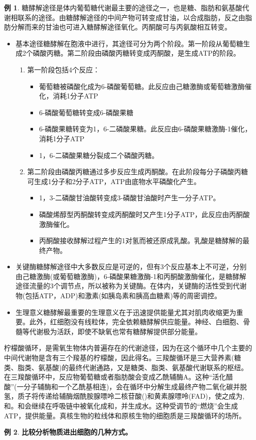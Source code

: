 \documentclass[UTF8]{article}
\theoremstyle{definition}
\newtheorem{example}{例}[section]
\begin{document}
\begin{example}
    糖酵解途径是体内葡萄糖代谢最主要的途径之一，也是糖、脂肪和氨基酸代谢相联系的途径。由糖酵解途径的中间产物可转变成甘油，以合成脂肪，反之由脂肪分解而来的甘油也可进入糖酵解途径氧化。丙酮酸可与丙氨酸相互转变。\begin{itemize}
        \item 基本途径糖酵解在胞液中进行，其途径可分为两个阶段。第一阶段从葡萄糖生成2个磷酸丙糖。第二阶段由磷酸丙糖转变成丙酮酸，是生成ATP的阶段。\begin{enumerate}
            \item 第一阶段包括4个反应：\begin{itemize}
                \item 葡萄糖被磷酸化成为6-磷酸葡萄糖。此反应由己糖激酶或葡萄糖激酶催化，消耗1分子ATP\item 6-磷酸葡萄糖转变成6-磷酸果糖\item 6-磷酸果糖转变为1，6-二磷酸果糖。此反应由6-磷酸果糖激酶-1催化，消耗1分子ATP\item 1，6-二磷酸果糖分裂成二个磷酸丙糖。
            \end{itemize}
            \item 第二阶段由磷酸丙糖通过多步反应生成丙酮酸。在此阶段每分子磷酸丙糖可生成1分子和2分子ATP，ATP由底物水平磷酸化产生。\begin{itemize}
                \item 1，3-二磷酸甘油酸转变成3-磷酸甘油酸时产生一分子ATP。\item 磷酸烯醇型丙酮酸转变成丙酮酸时又产生1分子ATP，此反应由丙酮酸激酶催化。\item 丙酮酸接收酵解过程产生的1对氢而被还原成乳酸。乳酸是糖酵解的最终产物。
            \end{itemize}
        \end{enumerate}
        \item 关键酶糖酵解途径中大多数反应是可逆的，但有3个反应基本上不可逆，分别由己糖激酶(或葡萄糖激酶)，6-磷酸果糖激酶-1和丙酮酸激酶催化，是糖酵解途径流量的3个调节点，所以被称为关键酶。在体内，关键酶的活性受到代谢物(包括ATP，ADP)和激素(如胰岛素和胰高血糖素)等的周密调控。
        \item 生理意义糖酵解最重要的生理意义在于迅速提供能量尤其对肌肉收缩更为重要。此外，红细胞没有线粒体，完全依赖糖酵解供应能量。神经、白细胞、骨髓等代谢极为活跃，即使不缺氧也常有糖酵解提供部分能量。
    \end{itemize}
    柠檬酸循环，是需氧生物体内普遍存在的代谢途径，因为在这个循环中几个主要的中间代谢物是含有三个羧基的柠檬酸，因此得名。三羧酸循环是三大营养素(糖类、脂类、氨基酸)的最终代谢通路，又是糖类、脂类、氨基酸代谢联系的枢纽。
    在三羧酸循环中，反应物葡萄糖或者脂肪酸会变成乙酰辅酶A。这种“活化醋酸”(一分子辅酶和一个乙酰基相连)，会在循环中分解生成最终产物二氧化碳并脱氢，质子将传递给辅酶烟酰胺腺嘌呤二核苷酸()和黄素腺嘌呤(FAD)，使之成为,和。和会继续在呼吸链中被氧化成和，并生成水。这种受调节的“燃烧”会生成ATP，提供能量。真核生物的粒线体和原核生物的细胞质是三羧酸循环的场所。
\end{example}\begin{example}\textbf{比较分析物质进出细胞的几种方式。}


\end{example}
\end{document}
